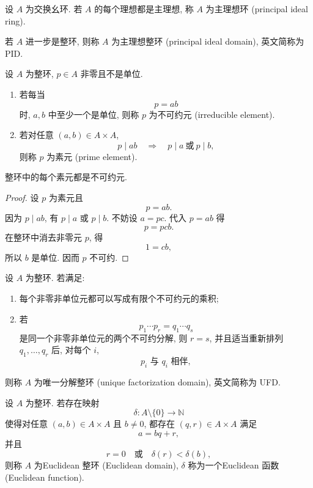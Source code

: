 \documentclass[usesamecnt, thmcnt=section, lang=cn, newtx, 10pt, scheme=chinese]{elegantbook}
\begin{document}
\begin{definition}[主理想环与主理想整环]\label{def:alg-pir-pid}
设 $A$ 为交换幺环. 若 $A$ 的每个理想都是主理想, 称 $A$ 为{\color{blue}主理想环 (principal ideal ring)}.

若 $A$ 进一步是整环, 则称 $A$ 为{\color{blue}主理想整环 (principal ideal domain)}, 英文简称为 PID.
\end{definition}

\begin{definition}[不可约元与素元]\label{def:alg-irreducible-prime}
设 $A$ 为整环, $p\in A$ 非零且不是单位.
\begin{enumerate}[label=\rm(\arabic*)]
  \item 若每当
  \[
   p=ab
  \]
  时, $a,b$ 中至少一个是单位, 则称 $p$ 为{\color{blue}不可约元 (irreducible element)}.
  \item 若对任意 $(a,b)\in A\times A$,
  \[
   p\mid ab
   \quad\Longrightarrow\quad
   p\mid a\ \text{或}\ p\mid b,
  \]
  则称 $p$ 为{\color{blue}素元 (prime element)}.
\end{enumerate}
\end{definition}

\begin{proposition}\label{prop:alg-prime-irreducible}
整环中的每个素元都是不可约元.
\end{proposition}

\begin{proof}
设 $p$ 为素元且
\[
 p=ab.
\]
因为 $p\mid ab$, 有 $p\mid a$ 或 $p\mid b$. 不妨设 $a=pc$. 代入 $p=ab$ 得
\[
 p=pcb.
\]
在整环中消去非零元 $p$, 得
\[
 1=cb,
\]
所以 $b$ 是单位. 因而 $p$ 不可约.
\end{proof}

\begin{definition}[唯一分解整环]\label{def:alg-ufd}
设 $A$ 为整环. 若满足:
\begin{enumerate}[label=\rm(\arabic*)]
  \item 每个非零非单位元都可以写成有限个不可约元的乘积;
  \item 若
  \[
   p_1\cdots p_r=q_1\cdots q_s
  \]
  是同一个非零非单位元的两个不可约分解, 则 $r=s$, 并且适当重新排列 $q_1,\ldots,q_r$ 后, 对每个 $i$,
  \[
   p_i\text{ 与 }q_i\text{ 相伴},
  \]
\end{enumerate}
则称 $A$ 为{\color{blue}唯一分解整环 (unique factorization domain)}, 英文简称为 UFD.
\end{definition}

\begin{definition}[Euclidean 整环]\label{def:alg-euclidean-domain}
设 $A$ 为整环. 若存在映射
\[
 \delta:A\setminus\{0\}\longrightarrow\mathbb N
\]
使得对任意 $(a,b)\in A\times A$ 且 $b\neq0$, 都存在 $(q,r)\in A\times A$ 满足
\[
 a=bq+r,
\]
并且
\[
 r=0
 \quad\text{或}\quad
 \delta(r)<\delta(b),
\]
则称 $A$ 为{\color{blue}Euclidean 整环 (Euclidean domain)}, $\delta$ 称为一个{\color{blue}Euclidean 函数 (Euclidean function)}.
\end{definition}
\end{document}
